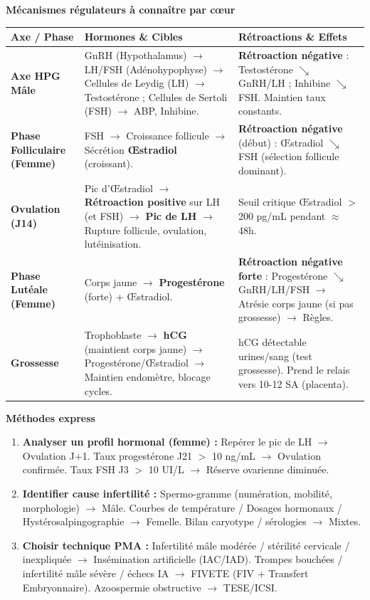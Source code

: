 \documentclass[11pt]{article}
\newcommand{\cle}[1]{{\popxbold\color{popdark}#1}}
\begin{document}
\begin{bilan}
\textbf{Mécanismes régulateurs à connaître par cœur}
\begin{center}
\begin{tabularx}{\linewidth}{|>{\bfseries}l|X|X|}\hline
\rowcolor{popblueL}
\textbf{Axe / Phase} & \textbf{Hormones \& Cibles} & \textbf{Rétroactions \& Effets} \\ \hline
\cle{Axe HPG Mâle} & GnRH (Hypothalamus) $\rightarrow$ LH/FSH (Adénohypophyse) $\rightarrow$ Cellules de Leydig (LH) $\rightarrow$ Testostérone ; Cellules de Sertoli (FSH) $\rightarrow$ ABP, Inhibine. & \textbf{Rétroaction négative} : Testostérone $\searrow$ GnRH/LH ; Inhibine $\searrow$ FSH. Maintien taux constants. \\ \hline
\cle{Phase Folliculaire (Femme)} & FSH $\rightarrow$ Croissance follicule $\rightarrow$ Sécrétion \textbf{Œstradiol} (croissant). & \textbf{Rétroaction négative} (début) : Œstradiol $\searrow$ FSH (sélection follicule dominant). \\ \hline
\cle{Ovulation (J14)} & Pic d'Œstradiol $\rightarrow$ \textbf{Rétroaction positive} sur LH (et FSH) $\rightarrow$ \textbf{Pic de LH} $\rightarrow$ Rupture follicule, ovulation, lutéinisation. & Seuil critique Œstradiol $>$ 200 pg/mL pendant $\approx$ 48h. \\ \hline
\cle{Phase Lutéale (Femme)} & Corps jaune $\rightarrow$ \textbf{Progestérone} (forte) + Œstradiol. & \textbf{Rétroaction négative forte} : Progestérone $\searrow$ GnRH/LH/FSH $\rightarrow$ Atrésie corps jaune (si pas grossesse) $\rightarrow$ Règles. \\ \hline
\cle{Grossesse} & Trophoblaste $\rightarrow$ \textbf{hCG} (maintient corps jaune) $\rightarrow$ Progestérone/Œstradiol $\rightarrow$ Maintien endomètre, blocage cycles. & hCG détectable urines/sang (test grossesse). Prend le relais vers 10-12 SA (placenta). \\ \hline
\end{tabularx}
\end{center}

\textbf{Méthodes express}
\begin{enumerate}
    \item \textbf{Analyser un profil hormonal (femme) :} Repérer le pic de LH $\rightarrow$ Ovulation J+1. Taux progestérone J21 $>$ 10 ng/mL $\rightarrow$ Ovulation confirmée. Taux FSH J3 $>$ 10 UI/L $\rightarrow$ Réserve ovarienne diminuée.
    \item \textbf{Identifier cause infertilité :} Spermo-gramme (numération, mobilité, morphologie) $\rightarrow$ Mâle. Courbes de température / Dosages hormonaux / Hystérosalpingographie $\rightarrow$ Femelle. Bilan caryotype / sérologies $\rightarrow$ Mixtes.
    \item \textbf{Choisir technique PMA :} Infertilité mâle modérée / stérilité cervicale / inexpliquée $\rightarrow$ Insémination artificielle (IAC/IAD). Trompes bouchées / infertilité mâle sévère / échecs IA $\rightarrow$ FIVETE (FIV + Transfert Embryonnaire). Azoospermie obstructive $\rightarrow$ TESE/ICSI.
\end{enumerate}
\end{bilan}
\end{document}
